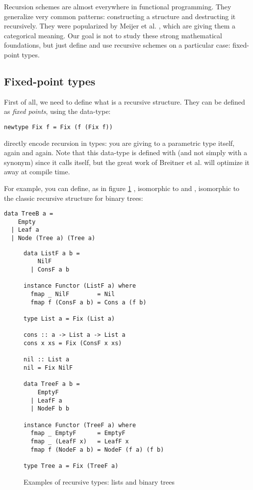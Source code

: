 
Recursion schemes are almost everywhere in functional programming. They generalize very common patterns: constructing a structure and destructing it recursively. They were popularized by Meijer et al. \cite{4cec4a43c86444479dc0003182424795}, which are giving them a categorical meaning. Our goal is not to study these strong mathematical foundations, but just define and use recursive schemes on a particular case: fixed-point types.

\subsection{Fixed-point types}
\label{subsec:defi}
First of all, we need to define what is a recursive structure. They can be defined as \emph{fixed points}, using the  data-type:
\begin{verbatim}
newtype Fix f = Fix (f (Fix f))
\end{verbatim}
 directly encode recursion in types: you are giving to a parametric type itself, again and again. Note that this data-type is defined with  (and not simply with a  synonym) since it calls itself, but the great work of Breitner et al. \cite{Breitner:2014:SZC:2692915.2628141} will optimize it away at compile time.

For example, you can define, as in figure \ref{fig:listtree}
, isomorphic to \minline{[a]} and , isomorphic to the classic recursive structure for binary trees:
\begin{verbatim}
data TreeB a =
    Empty
  | Leaf a
  | Node (Tree a) (Tree a)
\end{verbatim}

\begin{figure}
\begin{verbatim}
data ListF a b =
    NilF
  | ConsF a b

instance Functor (ListF a) where
  fmap _ NilF        = Nil
  fmap f (ConsF a b) = Cons a (f b)

type List a = Fix (List a)

cons :: a -> List a -> List a
cons x xs = Fix (ConsF x xs)

nil :: List a
nil = Fix NilF

data TreeF a b =
    EmptyF
  | LeafF a
  | NodeF b b

instance Functor (TreeF a) where
  fmap _ EmptyF      = EmptyF
  fmap _ (LeafF x)   = LeafF x
  fmap f (NodeF a b) = NodeF (f a) (f b)

type Tree a = Fix (TreeF a)
\end{verbatim}
\caption{Examples of recursive types: lists and binary trees}
\label{fig:listtree}
\end{figure}

